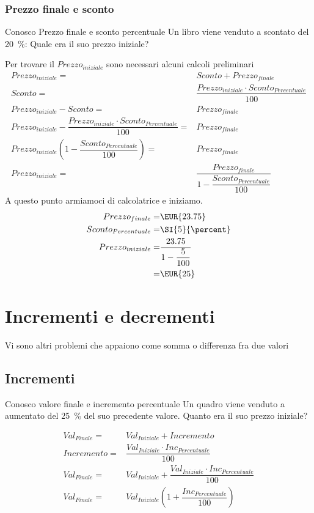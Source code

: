 \subsection{Prezzo finale e sconto}
	\begin{esempiot}{Conosco Prezzo finale e sconto percentuale}{}
Un libro viene venduto a  scontato del \SI{20}{\percent}: Quale era il suo prezzo iniziale?
\end{esempiot}
Per trovare il ${Prezzo}_{iniziale}$ sono necessari alcuni calcoli preliminari
\begin{align*}
	{Prezzo}_{iniziale}=&Sconto+{Prezzo}_{finale}\\
		Sconto=&\dfrac{{Prezzo}_{iniziale}\cdot {Sconto}_{Percentuale} }{100}\\
		{Prezzo}_{iniziale}-Sconto=&{Prezzo}_{finale}\\
	{Prezzo}_{iniziale}-\dfrac{{Prezzo}_{iniziale}\cdot {Sconto}_{Percentuale} }{100}=&{Prezzo}_{finale}\\
	{Prezzo}_{iniziale}\left(1-\dfrac{{Sconto}_{Percentuale} }{100}\right)=&{Prezzo}_{finale}\\
	{Prezzo}_{iniziale}=&\dfrac{{Prezzo}_{finale}}{1-\dfrac{{Sconto}_{Percentuale} }{100}}
\end{align*}
A questo punto armiamoci di calcolatrice e iniziamo.
\begin{align*}
	{Prezzo}_{finale}=&\mbox{\EUR{23.75}}\\
	{Sconto}_{Percentuale}=&\SI{5}{\percent}\\
{Prezzo}_{iniziale}=&\dfrac{23.75}{1-\dfrac{5}{100}}\\
=&\mbox{\EUR{25}}
\end{align*}
\chapter{Incrementi e decrementi}
Vi sono altri problemi che appaiono come somma o differenza fra due valori
\section{Incrementi}
	\begin{esempiot}{Conosco valore finale e incremento percentuale}{}
Un quadro viene venduto a   aumentato del \SI{25}{\percent} del suo precedente valore. Quanto era il suo prezzo iniziale?
\end{esempiot}
\begin{align*}
	{Val}_{Finale}=&{Val}_{Iniziale}+Incremento\\
	Incremento=&\dfrac{{Val}_{Iniziale}\cdot {Inc}_{Percentuale} }{100}\\
	{Val}_{Finale}=&{Val}_{Iniziale}+\dfrac{{Val}_{Iniziale}\cdot {Inc}_{Percentuale} }{100}\\
	{Val}_{Finale}=&{Val}_{Iniziale}\left(1+\dfrac{{Inc}_{Percentuale} }{100}\right)\\
\end{align*}